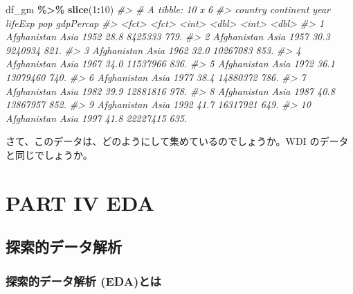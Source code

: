 \documentclass[
  xelatex, ja=standard]{bxjsbook}
\newenvironment{Shaded}{\begin{snugshade}}{\end{snugshade}}
\newcommand{\CommentTok}[1]{\textcolor[rgb]{0.56,0.35,0.01}{\textit{#1}}}
\newcommand{\DecValTok}[1]{\textcolor[rgb]{0.00,0.00,0.81}{#1}}
\newcommand{\FunctionTok}[1]{\textcolor[rgb]{0.13,0.29,0.53}{\textbf{#1}}}
\newcommand{\NormalTok}[1]{#1}
\newcommand{\SpecialCharTok}[1]{\textcolor[rgb]{0.81,0.36,0.00}{\textbf{#1}}}
\theoremstyle{definition}
\theoremstyle{definition}
\theoremstyle{definition}
\theoremstyle{definition}
\theoremstyle{remark}
\begin{document}
\begin{Shaded}
\begin{Highlighting}[]
\NormalTok{df\_gm }\SpecialCharTok{\%\textgreater{}\%} \FunctionTok{slice}\NormalTok{(}\DecValTok{1}\SpecialCharTok{:}\DecValTok{10}\NormalTok{)}
\CommentTok{\#\textgreater{} \# A tibble: 10 x 6}
\CommentTok{\#\textgreater{}    country     continent  year lifeExp      pop gdpPercap}
\CommentTok{\#\textgreater{}    \textless{}fct\textgreater{}       \textless{}fct\textgreater{}     \textless{}int\textgreater{}   \textless{}dbl\textgreater{}    \textless{}int\textgreater{}     \textless{}dbl\textgreater{}}
\CommentTok{\#\textgreater{}  1 Afghanistan Asia       1952    28.8  8425333      779.}
\CommentTok{\#\textgreater{}  2 Afghanistan Asia       1957    30.3  9240934      821.}
\CommentTok{\#\textgreater{}  3 Afghanistan Asia       1962    32.0 10267083      853.}
\CommentTok{\#\textgreater{}  4 Afghanistan Asia       1967    34.0 11537966      836.}
\CommentTok{\#\textgreater{}  5 Afghanistan Asia       1972    36.1 13079460      740.}
\CommentTok{\#\textgreater{}  6 Afghanistan Asia       1977    38.4 14880372      786.}
\CommentTok{\#\textgreater{}  7 Afghanistan Asia       1982    39.9 12881816      978.}
\CommentTok{\#\textgreater{}  8 Afghanistan Asia       1987    40.8 13867957      852.}
\CommentTok{\#\textgreater{}  9 Afghanistan Asia       1992    41.7 16317921      649.}
\CommentTok{\#\textgreater{} 10 Afghanistan Asia       1997    41.8 22227415      635.}
\end{Highlighting}
\end{Shaded}

さて、このデータは、どのようにして集めているのでしょうか。WDI のデータと同じでしょうか。

\hypertarget{part-part-iv-eda}{%
\part{PART IV EDA}\label{part-part-iv-eda}}

\hypertarget{intro2eda}{%
\chapter{探索的データ解析}\label{intro2eda}}

\hypertarget{ux63a2ux7d22ux7684ux30c7ux30fcux30bfux89e3ux6790-edaux3068ux306f}{%
\section{探索的データ解析 (EDA)とは}\label{ux63a2ux7d22ux7684ux30c7ux30fcux30bfux89e3ux6790-edaux3068ux306f}}
\end{document}
